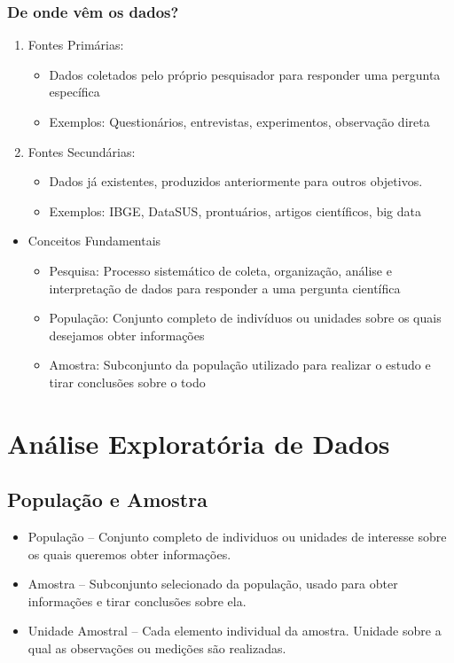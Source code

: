\documentclass[12pt]{article}
\begin{document}
    \subsubsection{De onde vêm os dados?}
    \begin{enumerate}
        \item Fontes Primárias:
        \begin{itemize}
            \item Dados coletados pelo próprio pesquisador para responder uma 
            pergunta específica
            \item Exemplos: Questionários, entrevistas, experimentos, observação 
            direta
        \end{itemize}
        \item Fontes Secundárias:
        \begin{itemize}
            \item Dados já existentes, produzidos anteriormente para outros 
            objetivos.
            \item Exemplos: IBGE, DataSUS, prontuários, artigos científicos, 
            big data
        \end{itemize}
    \end{enumerate}
    \begin{itemize}
        \item Conceitos Fundamentais
        \begin{itemize}
            \item Pesquisa: Processo sistemático de coleta, organização, análise 
            e interpretação de dados para responder a uma pergunta científica
            \item População: Conjunto completo de indivíduos ou unidades sobre 
            os quais desejamos obter informações
            \item Amostra: Subconjunto da população utilizado para realizar o 
            estudo e tirar conclusões sobre o todo
        \end{itemize}
    \end{itemize}
    

\section{Análise Exploratória de Dados}
    \subsection{População e Amostra}
    \begin{itemize}
        \item População -- Conjunto completo de individuos ou unidades de 
        interesse sobre os quais queremos obter informações.
        \item Amostra -- Subconjunto selecionado da população, usado para obter 
        informações e tirar conclusões sobre ela.
        \item Unidade Amostral -- Cada elemento individual da amostra. Unidade 
        sobre a qual as observações ou medições são realizadas.
    \end{itemize}
\end{document}
